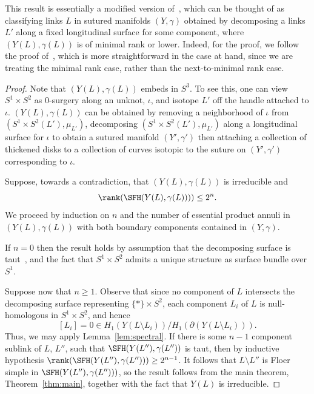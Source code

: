 \documentclass{amsart}
\theoremstyle{definition}
\theoremstyle{remark}
\numberwithin{equation}{section}
\begin{document}
This result is essentially a modified version of~\cite[Proposition 5.5]{binns2024floer}, which can be thought of as classifying links $L$ in sutured manifolds $(Y,\gamma)$ obtained by decomposing a links $L'$ along a fixed longitudinal surface for some component, where $(Y(L),\gamma(L))$ is of minimal rank or lower. Indeed, for the proof, we follow the proof of~\cite[Proposition 5.5]{binns2024floer}, which is more straightforward in the case at hand, since we are treating the minimal rank case, rather than the next-to-minimal rank case.
\begin{proof}
   Note that $(Y(L),\gamma(L))$ embeds in $S^3$. To see this, one can view $S^1\times S^2$ as $0$-surgery along an unknot, $\iota$, and isotope $L'$ off the handle attached to $\iota$. $(Y(L),\gamma(L))$ can be obtained by removing a neighborhood of $\iota$ from $(S^1\times S^2(L'),\mu_{L'})$, decomposing $(S^1\times S^2(L'),\mu_{L'})$ along a longitudinal surface for $\iota$ to obtain a sutured manifold $(Y',\gamma')$ then attaching a collection of thickened disks to a collection of curves isotopic to the suture on $(Y',\gamma')$ corresponding to $\iota$.

     Suppose, towards a contradiction, that $(Y(L),\gamma(L) )$ is irreducible and $${\rank(\SFH(Y(L),\gamma(L))))\leq 2^n}.$$ We proceed by induction on $n$ and the number of essential product annuli in $(Y(L),\gamma(L))$ with both boundary components contained in $(Y,\gamma)$.

    If $n=0$ then the result holds by assumption that the decomposing surface is taut~\cite[Theorem 1.4]{juhasz2008floer}, and the fact that $S^1\times S^2$ admits a unique structure as surface bundle over $S^1$.
    


Suppose now that $n\geq1$. Observe that since no component of $L$ intersects the decomposing surface representing $\{*\}\times S^2$, each component $L_i$ of $L$ is null-homologous in $S^1\times S^2$, and hence $$[L_i]=0\in H_1(Y(L\setminus L_i))/H_1(\partial (Y(L\setminus L_i))).$$ Thus, we may apply Lemma~\ref{lem:spectral}. If there is some $n-1$ component sublink of $L$, $L''$, such that $\SFH(Y(L''),\gamma(L''))$ is taut, then by inductive hypothesis $\rank(\SFH(Y(L''),\gamma(L'')))\geq 2^{n-1}$. It follows that $L\setminus L''$ is Floer simple in $\SFH(Y(L''),\gamma(L'')))$, so the result follows from the main theorem, Theorem~\ref{thm:main}, together with the fact that $Y(L)$ is irreducible.
    

\end{proof}
\end{document}
